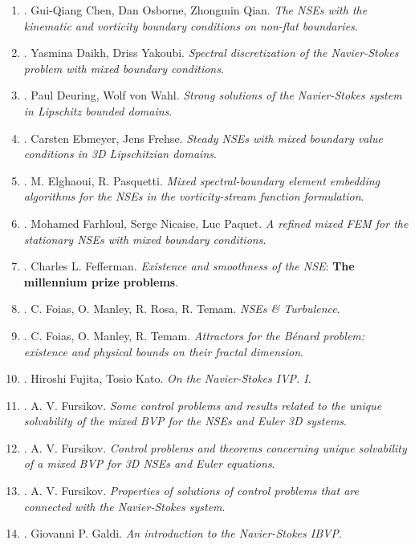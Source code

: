 \documentclass{article}
\begin{document}
\begin{enumerate}
	\item \cite{Chen_Osborne_Qian2009}. {\sc Gui-Qiang Chen, Dan Osborne, Zhongmin Qian}. {\it The NSEs with the kinematic and vorticity boundary conditions on non-flat boundaries}.
	\item \cite{Daikh_Yakoubi2017}. {\sc Yasmina Daikh, Driss Yakoubi}. {\it Spectral discretization of the Navier-Stokes problem with mixed boundary conditions}.
	\item \cite{Deuring_von-Walh1995}. {\sc Paul Deuring, Wolf von Wahl}. {\it Strong solutions of the Navier-Stokes system in Lipschitz bounded domains}.
	\item \cite{Ebmeyer_Frehse2001}. {\sc Carsten Ebmeyer, Jens Frehse}. {\it Steady NSEs with mixed boundary value conditions in 3D Lipschitzian domains}.
	\item \cite{Elghaoui_Pasquetti1999}. {\sc M.  Elghaoui, R. Pasquetti}. {\it Mixed spectral-boundary element embedding algorithms for the NSEs in the vorticity-stream function formulation}.
	\item \cite{Farhloul_Nicaise_Paquet2008}. {\sc Mohamed Farhloul, Serge Nicaise, Luc Paquet}. {\it A refined mixed FEM for the stationary NSEs with mixed boundary conditions}.
	\item \cite{Fefferman2006}. {\sc Charles L. Fefferman}. {\it Existence and smoothness of the NSE}: {\bf The millennium prize problems}.
	\item \cite{Foias_Manley_Rosa_Temam2001}. {\sc C. Foias, O. Manley, R. Rosa, R. Temam}. {\it NSEs \& Turbulence}.
	\item \cite{Foias_Manley_Temam1987}. {\sc C. Foias, O. Manley,  R. Temam}. {\it Attractors for the B\'{e}nard problem: existence and physical bounds on their fractal dimension}.
	\item \cite{Fujita_Kato1964}. {\sc Hiroshi Fujita, Tosio Kato}. {\it On the Navier-Stokes IVP. I}.
	\item \cite{Fursikov1980}. {\sc A. V. Fursikov}. {\it Some control problems and results related to the unique solvability of the mixed BVP for the NSEs and Euler 3D systems}.
	\item \cite{Fursikov1981}. {\sc A. V. Fursikov}. {\it Control problems and theorems concerning unique solvability of a mixed BVP for 3D NSEs and Euler equations}.
	\item \cite{Fursikov1982}. {\sc A. V. Fursikov}. {\it Properties of solutions of control problems that are connected with the Navier-Stokes system}.
	\item \cite{Galdi2000}. {\sc Giovanni P. Galdi}. {\it An introduction to the Navier-Stokes IBVP}.

\end{enumerate}
\end{document}
